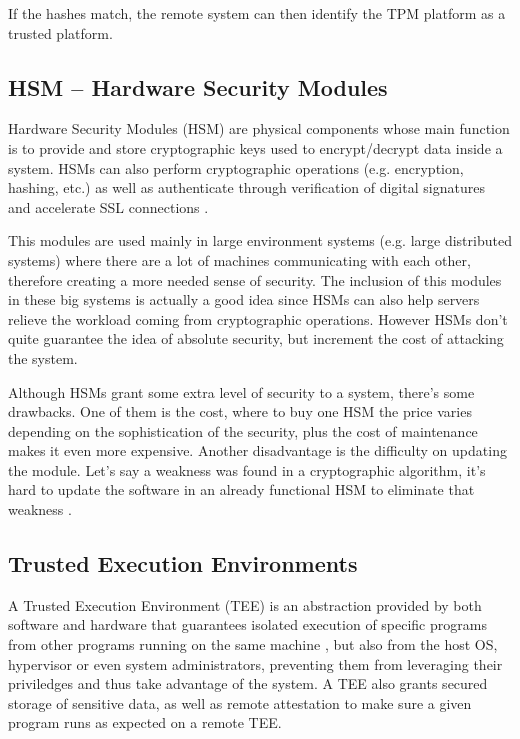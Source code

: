 If the hashes match, the remote system can then identify the TPM platform as a trusted platform.

\subsection{HSM – Hardware Security Modules}

Hardware Security Modules (HSM) are physical components whose main function is to provide and store cryptographic keys used to encrypt/decrypt data inside a system. HSMs can also perform cryptographic operations (e.g. encryption, hashing, etc.) as well as authenticate through verification of digital signatures and accelerate SSL connections \cite{hsmThesis}.

This modules are used mainly in large environment systems (e.g. large distributed systems) where there are a lot of machines communicating with each other, therefore creating a more needed sense of security. The inclusion of this modules in these big systems is actually a good idea since HSMs can also help servers relieve the workload coming from cryptographic operations. However HSMs don't quite guarantee the idea of absolute security, but increment the cost of attacking the system.

Although HSMs grant some extra level of security to a system, there's some drawbacks. One of them is the cost, where to buy one HSM the price varies depending on the sophistication of the security, plus the cost of maintenance makes it even more expensive. Another disadvantage is the difficulty on updating the module. Let's say a weakness was found in a cryptographic algorithm, it's hard to update the software in an already functional HSM to eliminate that weakness \cite{hsmPaper}.

\subsection{Trusted Execution Environments}

A Trusted Execution Environment (TEE) is an abstraction provided by both software and hardware that guarantees isolated execution of specific programs from other programs running on the same machine \cite{guiBorgesThesis}, but also from the host OS, hypervisor or even system administrators, preventing them from leveraging their priviledges and thus take advantage of the system. A TEE also grants secured storage of sensitive data, as well as remote attestation to make sure a given program runs as expected on a remote TEE. 

